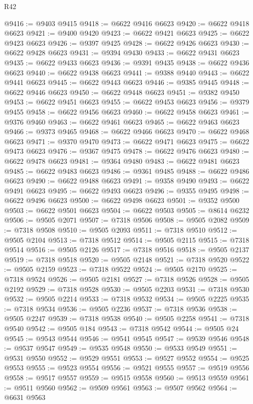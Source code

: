 \begin{lexlean}{R42}
\begin{coremodule}
{@9416 := @9403 @9415
@9418 := @6622 @9416 @6623
@9420 := @6622 @9418 @6623
@9421 := @9400 @9420
@9423 := @6622 @9421 @6623
@9425 := @6622 @9423 @6623
@9426 := @9397 @9425
@9428 := @6622 @9426 @6623
@9430 := @6622 @9428 @6623
@9431 := @9394 @9430
@9433 := @6622 @9431 @6623
@9435 := @6622 @9433 @6623
@9436 := @9391 @9435
@9438 := @6622 @9436 @6623
@9440 := @6622 @9438 @6623
@9441 := @9388 @9440
@9443 := @6622 @9441 @6623
@9445 := @6622 @9443 @6623
@9446 := @9385 @9445
@9448 := @6622 @9446 @6623
@9450 := @6622 @9448 @6623
@9451 := @9382 @9450
@9453 := @6622 @9451 @6623
@9455 := @6622 @9453 @6623
@9456 := @9379 @9455
@9458 := @6622 @9456 @6623
@9460 := @6622 @9458 @6623
@9461 := @9376 @9460
@9463 := @6622 @9461 @6623
@9465 := @6622 @9463 @6623
@9466 := @9373 @9465
@9468 := @6622 @9466 @6623
@9470 := @6622 @9468 @6623
@9471 := @9370 @9470
@9473 := @6622 @9471 @6623
@9475 := @6622 @9473 @6623
@9476 := @9367 @9475
@9478 := @6622 @9476 @6623
@9480 := @6622 @9478 @6623
@9481 := @9364 @9480
@9483 := @6622 @9481 @6623
@9485 := @6622 @9483 @6623
@9486 := @9361 @9485
@9488 := @6622 @9486 @6623
@9490 := @6622 @9488 @6623
@9491 := @9358 @9490
@9493 := @6622 @9491 @6623
@9495 := @6622 @9493 @6623
@9496 := @9355 @9495
@9498 := @6622 @9496 @6623
@9500 := @6622 @9498 @6623
@9501 := @9352 @9500
@9503 := @6622 @9501 @6623
@9504 := @6622 @9503
@9505 := @8614 @6232
@9506 := @9505 @2071
@9507 := @7318 @9506
@9508 := @9505 @2082
@9509 := @7318 @9508
@9510 := @9505 @2093
@9511 := @7318 @9510
@9512 := @9505 @2104
@9513 := @7318 @9512
@9514 := @9505 @2115
@9515 := @7318 @9514
@9516 := @9505 @2126
@9517 := @7318 @9516
@9518 := @9505 @2137
@9519 := @7318 @9518
@9520 := @9505 @2148
@9521 := @7318 @9520
@9522 := @9505 @2159
@9523 := @7318 @9522
@9524 := @9505 @2170
@9525 := @7318 @9524
@9526 := @9505 @2181
@9527 := @7318 @9526
@9528 := @9505 @2192
@9529 := @7318 @9528
@9530 := @9505 @2203
@9531 := @7318 @9530
@9532 := @9505 @2214
@9533 := @7318 @9532
@9534 := @9505 @2225
@9535 := @7318 @9534
@9536 := @9505 @2236
@9537 := @7318 @9536
@9538 := @9505 @2247
@9539 := @7318 @9538
@9540 := @9505 @2258
@9541 := @7318 @9540
@9542 := @9505 @184
@9543 := @7318 @9542
@9544 := @9505 @24
@9545 := @9543 @9544
@9546 := @9541 @9545
@9547 := @9539 @9546
@9548 := @9537 @9547
@9549 := @9535 @9548
@9550 := @9533 @9549
@9551 := @9531 @9550
@9552 := @9529 @9551
@9553 := @9527 @9552
@9554 := @9525 @9553
@9555 := @9523 @9554
@9556 := @9521 @9555
@9557 := @9519 @9556
@9558 := @9517 @9557
@9559 := @9515 @9558
@9560 := @9513 @9559
@9561 := @9511 @9560
@9562 := @9509 @9561
@9563 := @9507 @9562
@9564 := @6631 @9563
}
\end{coremodule}
\end{lexlean}
